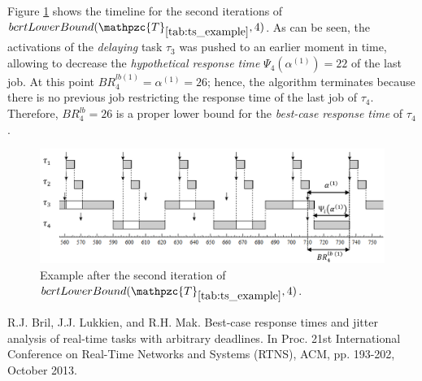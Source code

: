 \documentclass[fleqn]{article}
\begin{document}
Figure \ref{fig:bcrt_lb_ex2} shows the timeline for the second iterations of $bcrtLowerBound(\mathpzc{T}_{\ref{tab:ts_example}},4)$. As can be seen, the activations of the \textit{delaying} task $\tau_3$ was pushed to an earlier moment in time, allowing to decrease the \textit{hypothetical response time} $\Psi_4(\alpha^{(1)})=22$ of the last job. At this point $BR^{lb(1)}_4 = \alpha^{(1)} = 26$; hence, the algorithm terminates because there is no previous job restricting the response time of the last job of $\tau_4$. Therefore, $BR^{lb}_4 = 26$ is a proper lower bound for the \textit{best-case response time} of $\tau_4$.


\begin{figure}[H]
	\centering
	\includegraphics[width=1\linewidth]{figures/bcrt_lb_ex2.PNG}
	\caption{Example after the second iteration of $bcrtLowerBound(\mathpzc{T}_{\ref{tab:ts_example}},4)$. }
	\label{fig:bcrt_lb_ex2}
\end{figure}


\begin{thebibliography}{10}
	R.J. Bril, J.J. Lukkien, and R.H. Mak.
	Best-case response times and jitter analysis of real-time tasks with arbitrary deadlines.
	In Proc. 21st International Conference on Real-Time Networks and Systems (RTNS), ACM, pp. 193-202, October 2013.
	
\end{thebibliography}
\end{document}
